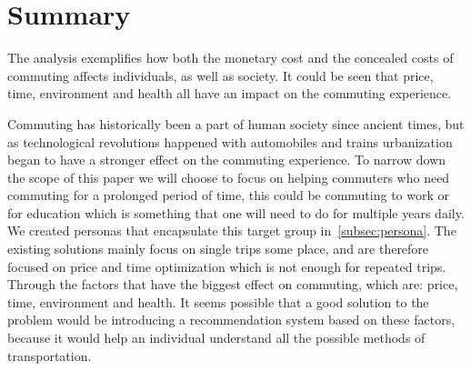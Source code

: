 \section{Summary}\label{sec:analysis-summary}

The analysis exemplifies how both the monetary cost and the concealed costs of commuting affects individuals,
as well as society.
It could be seen that price, time, environment and health all have an impact on the commuting experience.

Commuting has historically been a part of human society since ancient times, but as technological revolutions
happened with automobiles and trains urbanization began to have a stronger effect on the commuting experience.
To narrow down the scope of this paper we will choose to focus on helping commuters who need commuting for a prolonged
period of time, this could be commuting to work or for education which is something that one will need to do for
multiple years daily.
We created personas that encapsulate this target group in~\ref{subsec:persona}.
The existing solutions mainly focus on single trips some place, and are therefore focused on price and time
optimization which is not enough for repeated trips.
Through the factors that have the biggest effect on commuting, which are: price, time, environment and health.
It seems possible that a good solution to the problem would be introducing a recommendation system based on these
factors, because it would help an individual understand all the possible methods of transportation.
